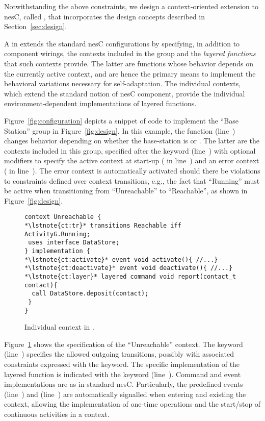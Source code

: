 \fakepar{\conesc} Notwithstanding the above constraints, we design a
context-oriented extension to nesC, called \conesc, that incorporates
the design concepts described in Section~\ref{sec:design}.

A  in \conesc extends the standard nesC
configurations by specifying, in addition to component wirings, the
contexts included in the group and the \emph{layered
  functions}~\cite{cop} that such contexts provide. The latter are
functions whose behavior depends on the currently active context, and
are hence the primary means to implement the behavioral variations
necessary for self-adaptation. The individual contexts, which extend
the standard notion of nesC component, provide the individual
environment-dependent implementations of layered functions.

Figure~\ref{fig:configuration} depicts a snippet of \conesc code to
implement the ``Base Station'' group in Figure~\ref{fig:design}. In
this example, the  function (line~)
changes behavior depending on whether the base-station is
 or . The latter are the contexts
included in this group, specified after the keyword 
(line~) with optional modifiers to specify the active
context at start-up ( in line~) and an
error context ( in line~). The error
context is automatically activated should there be violations to
constraints defined over context transitions, e.g., the fact that
``Running'' must be active when transitioning from
``Unreachable'' to ``Reachable'', as shown in Figure~\ref{fig:design}.

\begin{figure}[!tb]
\begin{lstlisting}[style=conescframe]
context Unreachable {
*\lstnote{ct:tr}* transitions Reachable iff ActivityG.Running;
 uses interface DataStore;
} implementation {
*\lstnote{ct:activate}* event void activate(){ //...}
*\lstnote{ct:deactivate}* event void deactivate(){ //...}
*\lstnote{ct:layer}* layered command void report(contact_t contact){
  call DataStore.deposit(contact);
 }
}
\end{lstlisting}
\vspace{-4mm}
\caption{Individual context in \conesc.}
  \label{fig:context}
\vspace{-2mm}
\end{figure}

Figure~\ref{fig:context} shows the \conesc specification of the
``Unreachable'' context. The keyword 
(line~) specifies the allowed outgoing transitions,
possibly with associated constraints expressed with the 
keyword. The specific implementation of the layered function is
indicated with the  keyword
(line~). Command and event implementations are as in
standard nesC. Particularly, the predefined events 
(line~) and 
(line~) are automatically signalled when entering
and existing the context, allowing the implementation of one-time
operations and the start/stop of continuous activities in a context.

